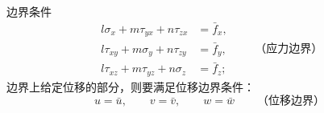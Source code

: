 \begin{myformula}{边界条件}
\begin{equation}
	\begin{aligned}
		l\sigma_x+m\tau_{yx}+n\tau_{zx}&=\bar f_x,\\[2pt]
		l\tau_{xy}+m\sigma_y+n\tau_{zy}&=\bar f_y,\\[2pt]
		l\tau_{xz}+m\tau_{yz}+n\sigma_z&=\bar f_z;
	\end{aligned}
	\qquad\text{（应力边界）}
\end{equation}
边界上给定位移的部分，则要满足位移边界条件：
\begin{equation}
    u=\bar u,
	\qquad
	v=\bar v,
	\qquad
	w=\bar w
	\qquad\text{（位移边界）}
\end{equation}
\end{myformula}
